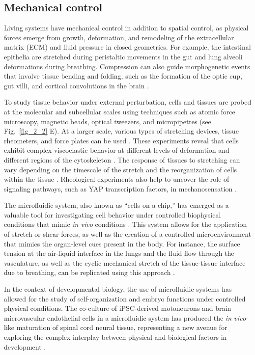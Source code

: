 \hypertarget{mechanical-control}{%
\subsection{Mechanical control}\label{mechanical-control}}

Living systems have mechanical control in addition to spatial control, as physical forces emerge from growth, deformation, and remodeling of the extracellular matrix (ECM) and fluid pressure in closed geometries. For example, the intestinal epithelia are stretched during peristaltic movements in the gut and lung alveoli deformations during breathing. Compression can also guide morphogenetic events that involve tissue bending and folding, such as the formation of the optic cup, gut villi, and cortical convolutions in the brain \cite{okuda2018, shyer2013, tallinen2016}.

To study tissue behavior under external perturbation, cells and tissues are probed at the molecular and subcellular scales using techniques such as atomic force microscopy, magnetic beads, optical tweezers, and micropipettes \cite{bao2003} (see Fig.~\ref{fig_2_2} E). At a larger scale, various types of stretching devices, tissue rheometers, and force plates can be used \cite{xi2018}. These experiments reveal that cells exhibit complex viscoelastic behavior at different levels of deformation and different regions of the cytoskeleton \cite{mofrad2009}. The response of tissues to stretching can vary depending on the timescale of the stretch and the reorganization of
cells within the tissue \cite{guillot2013}. Rheological experiments also help to uncover the role of signaling pathways, such as YAP transcription factors, in mechanosensation \cite{wagh2021}.

The microfluidic system, also known as ``cells on a chip,'' has emerged as a valuable tool for investigating cell behavior under controlled biophysical conditions that mimic \textit{in vivo} conditions \cite{ingber2018}. This
system allows for the application of stretch or shear forces, as well as the creation of a controlled microenvironment that mimics the organ-level cues present in the body. For instance, the surface tension at the air-liquid interface in the lungs and the fluid flow through the vasculature, as well as the cyclic mechanical stretch of the tissue-tissue interface due to breathing, can be replicated using this approach \cite{huh2010}.

In the context of developmental biology, the use of microfluidic systems has allowed for the study of self-organization and embryo functions under controlled physical conditions. The co-culture of iPSC-derived motoneurons and brain microvascular endothelial cells in a microfluidic system has produced the \textit{in vivo}-like maturation of spinal cord neural tissue, representing a new avenue for exploring the complex interplay between physical and biological factors in development \cite{sances2018, samal2019}.

